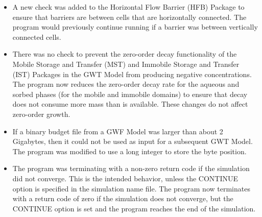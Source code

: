 \begin{itemize}
	        \item A new check was added to the Horizontal Flow Barrier (HFB) Package to ensure that barriers are between cells that are horizontally connected.  The program would previously continue running if a barrier was between vertically connected cells.
	        \item There was no check to prevent the zero-order decay functionality of the Mobile Storage and Transfer (MST) and Immobile Storage and Transfer (IST) Packages in the GWT Model from producing negative concentrations.  The program now reduces the zero-order decay rate for the aqueous and sorbed phases (for the mobile and immobile domains) to ensure that decay does not consume more mass than is available.  These changes do not affect zero-order growth.
	        \item If a binary budget file from a GWF Model was larger than about 2 Gigabytes, then it could not be used as input for a subsequent GWT Model.  The program was modified to use a long integer to store the byte position.
	        \item The program was terminating with a non-zero return code if the simulation did not converge.  This is the intended behavior, unless the CONTINUE option is specified in the simulation name file.  The program now terminates with a return code of zero if the simulation does not converge, but the CONTINUE option is set and the program reaches the end of the simulation.
	\end{itemize}


